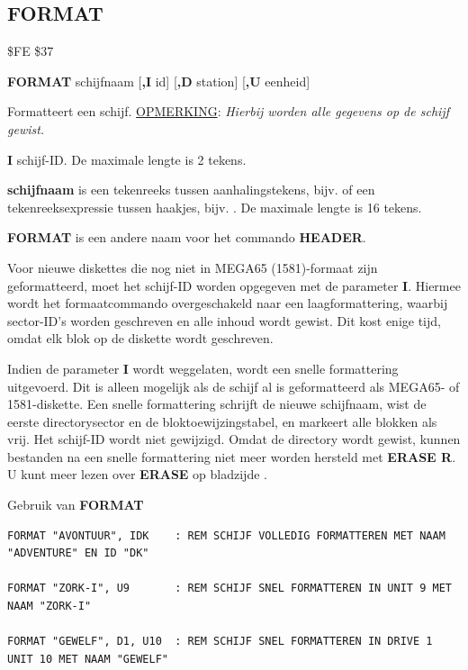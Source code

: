 \subsection{FORMAT}
\begin{description}[leftmargin=2cm,style=nextline]
\item [Token:]    \$FE \$37

\item [Formaat:]   {\bf FORMAT} schijfnaam [{\bf,I} id] [{\bf,D} station] [{\bf,U} eenheid]

\item [Gebruik:]    Formatteert een schijf. \underline{OPMERKING}: {\em Hierbij worden alle gegevens op de schijf gewist.}

                  {\bf I} schijf-ID. De maximale lengte is 2 tekens.

{\bf schijfnaam} is een tekenreeks tussen aanhalingstekens, bijv.  of een tekenreeksexpressie tussen haakjes, bijv. . De maximale lengte is 16 tekens.

                  \drivedefinition

                  \unitdefinition

\item [Opmerkingen:]  {\bf FORMAT} is een andere naam voor het commando {\bf HEADER}.

                  Voor nieuwe diskettes die nog niet in MEGA65 (1581)-formaat zijn geformatteerd, moet het schijf-ID worden opgegeven met de parameter {\bf I}. Hiermee wordt het formaatcommando overgeschakeld naar een laagformattering, waarbij sector-ID's worden geschreven en alle inhoud wordt gewist. Dit kost enige tijd, omdat elk blok op de diskette wordt geschreven.

                  Indien de parameter {\bf I} wordt weggelaten, wordt een snelle formattering uitgevoerd. Dit is alleen mogelijk als de schijf al is geformatteerd als MEGA65- of 1581-diskette. Een snelle formattering schrijft de nieuwe schijfnaam, wist de eerste directorysector en de bloktoewijzingstabel, en markeert alle blokken als vrij. Het schijf-ID wordt niet gewijzigd. Omdat de directory wordt gewist, kunnen bestanden na een snelle formattering niet meer worden hersteld met {\bf ERASE R}. U kunt meer lezen over {\bf ERASE} op bladzijde \pageref{BASIC 65 Commands!ERASE}.

\item [Voorbeelden:] Gebruik van {\bf FORMAT}

\begin{tcolorbox}[colback=black,coltext=white]
\verbatimfont{\codefont}
\begin{verbatim}
FORMAT "AVONTUUR", IDK    : REM SCHIJF VOLLEDIG FORMATTEREN MET NAAM "ADVENTURE" EN ID "DK"

FORMAT "ZORK-I", U9       : REM SCHIJF SNEL FORMATTEREN IN UNIT 9 MET NAAM "ZORK-I"

FORMAT "GEWELF", D1, U10  : REM SCHIJF SNEL FORMATTEREN IN DRIVE 1 UNIT 10 MET NAAM "GEWELF"
\end{verbatim}
\end{tcolorbox}
\end{description}

